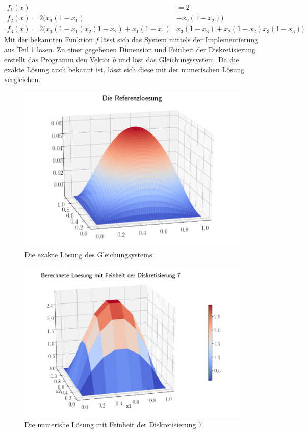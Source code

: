 \documentclass[smallheadings]{scrartcl}
\numberwithin{equation}{section}
\begin{document}
\begin{align}
f_1(x)&=2 \\
f_2(x) = 2(x_1(1-x_1)&+x_2(1-x_2)) \\
f_3(x)= 2(x_1(1-x_1)x_2(1-x_2)+x_1(1-x_1)&x_3(1-x_3)+x_2(1-x_2)x_3(1-x_3))
\end{align}
Mit der bekannten Funktion $f$ lässt sich das System mittels der Implementierung aus Teil 1 lösen. Zu einer gegebenen Dimension und Feinheit der Diskretisierung erstellt das Programm den Vektor $b$ und löst das Gleichungssystem. Da die exakte Lösung auch bekannt ist, lässt sich diese mit der numerischen Lösung vergleichen.

\begin{figure}
	\centering
	\includegraphics[width=0.7\linewidth]{Bericht/Bilder/referenz}
	\caption{Die exakte Lösung des Gleichungsystems}
	\label{fig:referenz}
\end{figure}

\begin{figure}
	\centering
	\includegraphics[width=0.7\linewidth]{Bericht/Bilder/3dlos7}
	\caption{Die numerishe Lösung mit Feinheit der Diskretisierung 7}
	\label{fig:3dlos7}
\end{figure}
\end{document}
